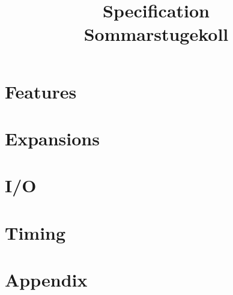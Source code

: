 \documentclass[a4paper,11pt]{article}
\begin{document}
\title{Specification \\ Sommarstugekoll}

\maketitle

\tableofcontents

\section{Features}

\section{Expansions}

\section{I/O}

\section{Timing}

\section{Appendix}
\end{document}
